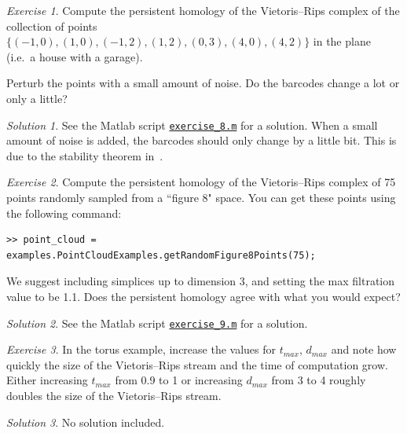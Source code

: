 \documentclass[amscd, amssymb, verbatim]{amsart}[12pt]
\theoremstyle{remark}
\theoremstyle{remark}
\newtheorem{exerciseSol}{Exercise}
\theoremstyle{remark}
\newtheorem*{solution}{Solution}
\begin{document}
\begin{exerciseSol}
Compute the persistent homology of the Vietoris--Rips complex of the collection of points $\{(-1,0),(1,0),(-1,2),(1,2),(0,3),(4,0),(4,2)\}$ in the plane (i.e.\ a house with a garage).

Perturb the points with a small amount of noise. Do the barcodes change a lot or only a little?
\end{exerciseSol}

\begin{solution}
See the Matlab script \href{https://github.com/appliedtopology/javaplex/tree/master/src/matlab/for_distribution/tutorial_solutions/exercise_8.m}{\texttt{exercise\_8.m}} for a solution. When a small amount of noise is added, the barcodes should only change by a little bit. This is due to the stability theorem in~\citet{ChazalDeSilvaOudot2013}.
\end{solution}

\begin{exerciseSol}
Compute the persistent homology of the Vietoris--Rips complex of 75 points randomly sampled from a ``figure 8" space. You can get these points using the following command:

\begin{verbatim}
>> point_cloud = examples.PointCloudExamples.getRandomFigure8Points(75);
\end{verbatim}

We suggest including simplices up to dimension 3, and setting the max filtration value to be 1.1. Does the persistent homology agree with what you would expect?
\end{exerciseSol}

\begin{solution}
See the Matlab script \href{https://github.com/appliedtopology/javaplex/tree/master/src/matlab/for_distribution/tutorial_solutions/exercise_9.m}{\texttt{exercise\_9.m}} for a solution.
\end{solution}

\begin{exerciseSol}
In the torus example, increase the values for $t_{max}$, $d_{max}$ and note how quickly the size of the Vietoris--Rips stream and the time of computation grow. Either increasing $t_{max}$ from 0.9 to 1 or increasing $d_{max}$ from 3 to 4 roughly doubles the size of the Vietoris--Rips stream.
\end{exerciseSol}

\begin{solution}
No solution included. 
\end{solution}
\end{document}
